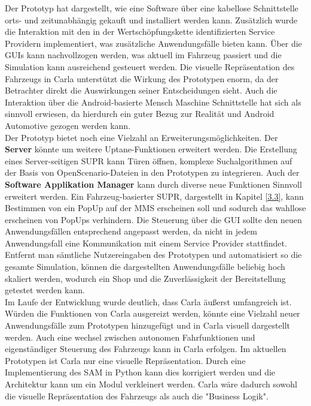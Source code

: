 Der Prototyp hat dargestellt, wie eine Software über eine kabellose Schnittstelle orts- und zeitunabhängig gekauft und installiert werden kann. Zusätzlich wurde die Interaktion mit den in der Wertschöpfungskette identifizierten Service Providern implementiert, was zusätzliche Anwendungsfälle bieten kann. Über die GUIs kann nachvollzogen werden, was aktuell im Fahrzeug passiert und die Simulation kann ausreichend gesteuert werden. Die visuelle Repräsentation des Fahrzeugs in Carla unterstützt die Wirkung des Prototypen enorm, da der Betrachter direkt die Auswirkungen seiner Entscheidungen sieht. Auch die Interaktion über die Android-basierte Mensch Maschine Schnittstelle hat sich als sinnvoll erwiesen, da hierdurch ein guter Bezug zur Realität und Android Automotive gezogen werden kann. \\

Der Prototyp bietet noch eine Vielzahl an Erweiterungsmöglichkeiten. Der \textbf{Server} könnte um weitere Uptane-Funktionen erweitert werden. Die Erstellung eines Server-seitigen SUPR kann Türen öffnen, komplexe Suchalgorithmen auf der Basis von OpenScenario-Dateien in den Prototypen zu integrieren. Auch der \textbf{Software Applikation Manager} kann durch diverse neue Funktionen Sinnvoll erweitert werden. Ein Fahrzeug-basierter SUPR, dargestellt in Kapitel \ref{3.3}, kann Bestimmen von ein PopUp auf der MMS erscheinen soll und sodurch das wahllose erscheinen von PopUps verhindern. Die Steuerung über die GUI sollte den neuen Anwendungsfällen entsprechend angepasst werden, da nicht in jedem Anwendungsfall eine Kommunikation mit einem Service Provider stattfindet. Entfernt man sämtliche Nutzereingaben des Prototypen und automatisiert so die gesamte Simulation, können die dargestellten Anwendungsfälle beliebig hoch skaliert werden, wodurch ein Shop und die Zuverlässigkeit der Bereitstellung getestet werden kann.\\

Im Laufe der Entwicklung wurde deutlich, dass Carla äußerst umfangreich ist. Würden die Funktionen von Carla ausgereizt werden, könnte eine Vielzahl neuer Anwendungsfälle zum Prototypen hinzugefügt und in Carla visuell dargestellt werden. Auch eine wechsel zwischen autonomen Fahrfunktionen und eigenständiger Steuerung des Fahrzeugs kann in Carla erfolgen. Im aktuellen Prototypen ist Carla nur eine visuelle Repräsentation. Durch eine Implementierung des SAM in Python kann dies korrigiert werden und die Architektur kann um ein Modul verkleinert werden. Carla wäre dadurch sowohl die visuelle Repräsentation des Fahrzeugs als auch die "Business Logik".